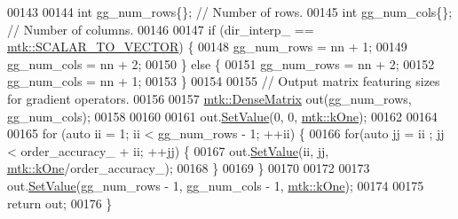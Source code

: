 \begin{DoxyCode}
00143 
00144   \textcolor{keywordtype}{int} gg\_num\_rows\{\};  \textcolor{comment}{// Number of rows.}
00145   \textcolor{keywordtype}{int} gg\_num\_cols\{\};  \textcolor{comment}{// Number of columns.}
00146 
00147   \textcolor{keywordflow}{if} (dir\_interp\_ == \hyperlink{namespacemtk_ga674ec67bd1baa04e5dc06c2bcc351972abc9e2b8cd5a497c9f3252a792e356139}{mtk::SCALAR\_TO\_VECTOR}) \{
00148     gg\_num\_rows = nn + 1;
00149     gg\_num\_cols = nn + 2;
00150   \} \textcolor{keywordflow}{else} \{
00151     gg\_num\_rows = nn + 2;
00152     gg\_num\_cols = nn + 1;
00153   \}
00154 
00155   \textcolor{comment}{// Output matrix featuring sizes for gradient operators.}
00156 
00157   \hyperlink{classmtk_1_1DenseMatrix}{mtk::DenseMatrix} out(gg\_num\_rows, gg\_num\_cols);
00158 
00160 
00161   out.\hyperlink{classmtk_1_1DenseMatrix_ae0f873a6d3a734da467cafb817da64ae}{SetValue}(0, 0, \hyperlink{group__c01-roots_ga26407c24d43b6b95480943340d285c71}{mtk::kOne});
00162 
00164 
00165   \textcolor{keywordflow}{for} (\textcolor{keyword}{auto} ii = 1; ii < gg\_num\_rows - 1; ++ii) \{
00166     \textcolor{keywordflow}{for}(\textcolor{keyword}{auto} jj = ii ; jj < order\_accuracy\_ + ii; ++jj) \{
00167       out.\hyperlink{classmtk_1_1DenseMatrix_ae0f873a6d3a734da467cafb817da64ae}{SetValue}(ii, jj, \hyperlink{group__c01-roots_ga26407c24d43b6b95480943340d285c71}{mtk::kOne}/order\_accuracy\_);
00168     \}
00169   \}
00170 
00172 
00173   out.\hyperlink{classmtk_1_1DenseMatrix_ae0f873a6d3a734da467cafb817da64ae}{SetValue}(gg\_num\_rows - 1, gg\_num\_cols - 1, \hyperlink{group__c01-roots_ga26407c24d43b6b95480943340d285c71}{mtk::kOne});
00174 
00175   \textcolor{keywordflow}{return} out;
00176 \}
\end{DoxyCode}
